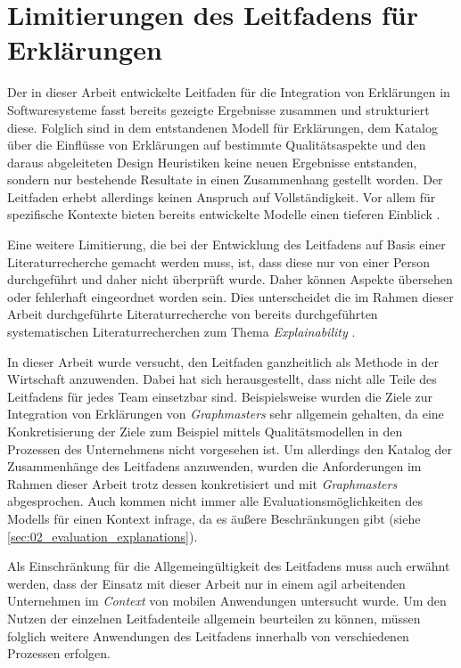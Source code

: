 \section{Limitierungen des Leitfadens für Erklärungen}

Der in dieser Arbeit entwickelte Leitfaden für die Integration von Erklärungen in Softwaresysteme fasst bereits gezeigte Ergebnisse zusammen und strukturiert diese. Folglich sind in dem entstandenen Modell für Erklärungen, dem Katalog über die Einflüsse von Erklärungen auf bestimmte Qualitätsaspekte und den daraus abgeleiteten Design Heuristiken keine neuen Ergebnisse entstanden, sondern nur bestehende Resultate in einen Zusammenhang gestellt worden. 
Der Leitfaden erhebt allerdings keinen Anspruch auf Vollständigkeit. Vor allem für spezifische Kontexte bieten bereits entwickelte Modelle einen tieferen Einblick \cite{nunes_systematic_2017, sokol_explainability_2020}.

Eine weitere Limitierung, die bei der Entwicklung des Leitfadens auf Basis einer Literaturrecherche gemacht werden muss, ist, dass diese nur von einer Person durchgeführt und daher nicht überprüft wurde. Daher können Aspekte übersehen oder fehlerhaft eingeordnet worden sein. Dies unterscheidet die im Rahmen dieser Arbeit durchgeführte Literaturrecherche von bereits durchgeführten systematischen Literaturrecherchen zum Thema \textit{Explainability} \cite[vgl.][]{nunes_systematic_2017,chazette_knowledge_nodate}.

In dieser Arbeit wurde versucht, den Leitfaden ganzheitlich als Methode in der Wirtschaft anzuwenden. Dabei hat sich herausgestellt, dass nicht alle Teile des Leitfadens für jedes Team einsetzbar sind. Beispielsweise wurden die Ziele zur Integration von Erklärungen von \textit{Graphmasters} sehr allgemein gehalten, da eine Konkretisierung der Ziele zum Beispiel mittels Qualitätsmodellen \cite{schneider2012abenteuer} in den Prozessen des Unternehmens nicht vorgesehen ist. Um allerdings den Katalog der Zusammenhänge des Leitfadens anzuwenden, wurden die Anforderungen im Rahmen dieser Arbeit trotz dessen konkretisiert und mit \textit{Graphmasters} abgesprochen. Auch kommen nicht immer alle Evaluationsmöglichkeiten des Modells für einen Kontext infrage, da es äußere Beschränkungen gibt (siehe \autoref{sec:02_evaluation_explanations}).

Als Einschränkung für die Allgemeingültigkeit des Leitfadens muss auch erwähnt werden, dass der Einsatz mit dieser Arbeit nur in einem agil arbeitenden Unternehmen im \textit{Context} von mobilen Anwendungen untersucht wurde. Um den Nutzen der einzelnen Leitfadenteile allgemein beurteilen zu können, müssen folglich weitere Anwendungen des Leitfadens innerhalb von verschiedenen Prozessen erfolgen.

